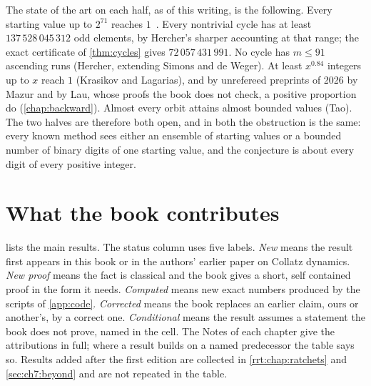 The state of the art on each half, as of this writing, is the following.
Every starting value up to $2^{71}$ reaches $1$~\cite{barina2025}. Every
nontrivial cycle has at least $137\,528\,045\,312$ odd elements, by Hercher's
sharper accounting at that range; the exact certificate of \cref{thm:cycles} gives $72\,057\,431\,991$. No cycle has $m\le91$
ascending runs (Hercher, extending Simons and de Weger). At least $x^{0.84}$
integers up to $x$ reach $1$ (Krasikov and Lagarias), and by unrefereed preprints of 2026 by Mazur and by Lau, whose proofs the book does not check, a positive proportion do (\cref{chap:backward}). Almost every orbit attains
almost bounded values (Tao). The two halves are therefore both open, and in
both the obstruction is the same: every known method sees either an ensemble of
starting values or a bounded number of binary digits of one starting value, and the
conjecture is about every digit of every positive integer.

\section{What the book contributes}\label{sec:ch10d:contrib}

 lists the main results. The status column uses five
labels. \emph{New} means the result first appears in this book or in the
authors' earlier paper on Collatz dynamics. \emph{New proof} means the fact is
classical and the book gives a short, self contained proof in the form it needs.
\emph{Computed} means new exact numbers produced by the scripts of
\cref{app:code}. \emph{Corrected} means the book replaces an earlier claim,
ours or another's, by a correct one. \emph{Conditional} means the result assumes a statement the book does not prove, named in the cell. The Notes of each chapter give the
attributions in full; where a result builds on a named predecessor the table
says so. Results added after the first edition are collected in \cref{rrt:chap:ratchets} and \cref{sec:ch7:beyond} and are not repeated in the table.

